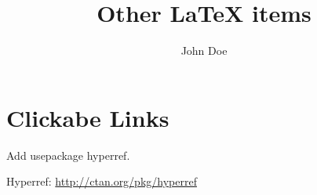 \documentclass{article}
\title{Other LaTeX items}
\author{John Doe}
\date{}
\begin{document}
\maketitle
\section{Clickabe Links}

Add usepackage hyperref.

\noindent
Hyperref: \url{http://ctan.org/pkg/hyperref}
\end{document}
